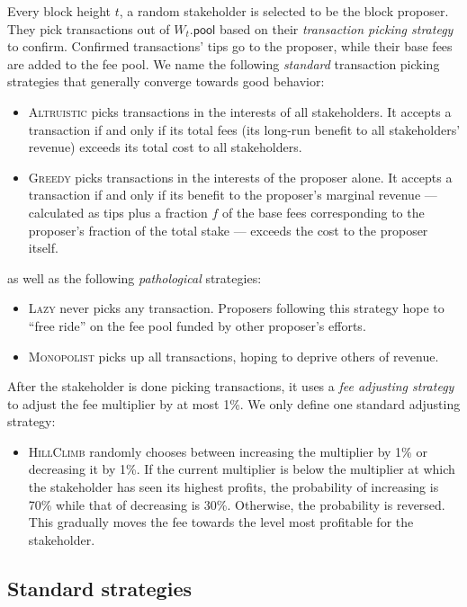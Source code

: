 \documentclass[letterpaper,12pt,oneside]{article}
\begin{document}
Every block height $t$, a random stakeholder is selected to be the block proposer. They pick transactions out of $W_t.\mathsf{pool}$ based on their \emph{transaction picking strategy} to confirm. Confirmed transactions' tips go to the proposer, while their base fees are added to the fee pool. We name the following \emph{standard} transaction picking strategies that generally converge towards good behavior:
\begin{itemize}
    \item \textsc{Altruistic} picks transactions in the interests of all stakeholders. It accepts a transaction if and only if its total fees (its long-run benefit to all stakeholders' revenue) exceeds its total cost to all stakeholders.
    \item \textsc{Greedy} picks transactions in the interests of the proposer alone. It accepts a transaction if and only if its benefit to the proposer's marginal revenue --- calculated as tips plus a fraction $f$ of the base fees corresponding to the proposer's fraction of the total stake --- exceeds the cost to the proposer itself.
\end{itemize}
as well as the following \emph{pathological} strategies:
\begin{itemize}
    \item \textsc{Lazy} never picks any transaction. Proposers following this strategy hope to ``free ride'' on the fee pool funded by other proposer's efforts.
    \item \textsc{Monopolist} picks up all transactions, hoping to deprive others of revenue.
\end{itemize}

After the stakeholder is done picking transactions, it uses a \emph{fee adjusting strategy} to adjust the fee multiplier by at most 1\%. We only define one standard adjusting strategy:
\begin{itemize}
    \item \textsc{HillClimb} randomly chooses between increasing the multiplier by 1\% or decreasing it by 1\%. If the current multiplier is below the multiplier at which the stakeholder has seen its highest profits, the probability of increasing is 70\% while that of decreasing is 30\%. Otherwise, the probability is reversed. This gradually moves the fee towards the level most profitable for the stakeholder.
\end{itemize}

\subsection{Standard strategies}
\end{document}
